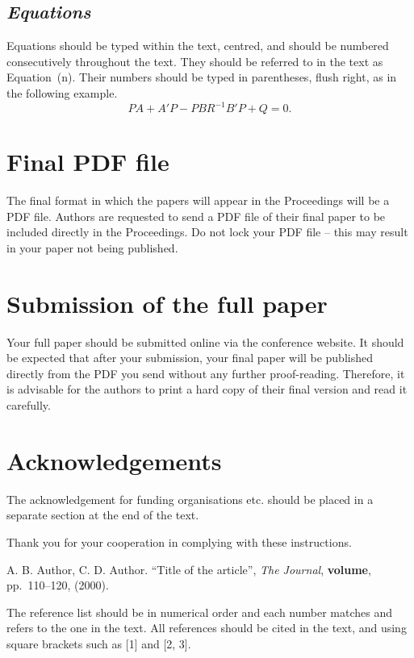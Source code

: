\documentclass[12pt]{IET02}
\begin{document}
\subsection{\it Equations}

Equations should be typed within the text, centred, and should be numbered
consecutively throughout the text. They should be referred to in the text as
Equation~(n). Their numbers should be typed in parentheses, flush right, as
in the following example.
\begin{equation}
PA + A'P - PBR^{-1}B'P + Q = 0.
\end{equation}

\section{Final PDF file}

The final format in which the papers will appear in the Proceedings will be
a PDF file. Authors are requested to send a PDF file of their final paper to
be included directly in the Proceedings. Do not lock your PDF file -- this
may result in your paper not being published.

\section{Submission of the full paper}

Your full paper should be submitted online via the conference website. It
should be expected that after your submission, your final paper will be
published directly from the PDF you send without any further proof-reading.
Therefore, it is advisable for the authors to print a hard copy of their
final version and read it carefully.

\section*{Acknowledgements}

The acknowledgement for funding organisations etc. should be placed in a
separate section at the end of the text.

Thank you for your cooperation in complying with these instructions.

\begin{thebibliography}{9}
\vspace{1pc}

\bibitem{}A. B. Author, C. D. Author. ``Title of the article'',
\textit{The Journal}, \textbf{volume}, pp.~110--120, (2000).\vspace{.4pc}
\end{thebibliography}

The reference list should be in numerical order and each number matches and
refers to the one in the text. All references should be cited in the text,
and using square brackets such as [1] and [2, 3].
\end{document}
